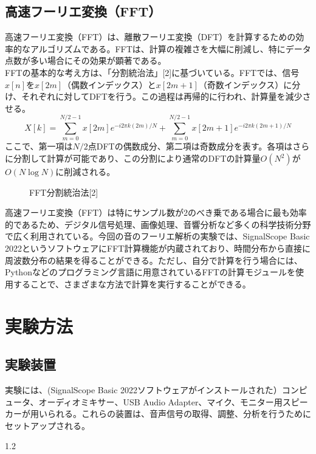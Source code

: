 \documentclass{article}
\begin{document}
\subsection{高速フーリエ変換（FFT）}
\begin{spacing}{1.2} %
    高速フーリエ変換（FFT）は、離散フーリエ変換（DFT）を計算するための効率的なアルゴリズムである。FFTは、計算の複雑さを大幅に削減し、特にデータ点数が多い場合にその効果が顕著である。\\
    \indent FFTの基本的な考え方は、「分割統治法」[2]に基づいている。FFTでは、信号$x[n]$を$x[2m]$（偶数インデックス）と$x[2m+1]$（奇数インデックス）に分け、それぞれに対してDFTを行う。この過程は再帰的に行われ、計算量を減少させる。
    \[X[k] = \sum_{m=0}^{N/2-1} x[2m] e^{-i 2\pi k(2m)/N} + \sum_{m=0}^{N/2-1} x[2m+1] e^{-i 2\pi k(2m+1)/N}\]
    \indent ここで、第一項は$N/2$点DFTの偶数成分、第二項は奇数成分を表す。各項はさらに分割して計算が可能であり、この分割により通常のDFTの計算量$O(N^2)$が$O(N\log N)$に削減される。
\end{spacing}
\begin{figure}[ht] %
    \centering
    \caption{FFT分割統治法[2]}
\end{figure}
\FloatBarrier
\begin{spacing}{1.2} %
    高速フーリエ変換（FFT）は特にサンプル数が2のべき乗である場合に最も効率的であるため、デジタル信号処理、画像処理、音響分析など多くの科学技術分野で広く利用されている。今回の音のフーリエ解析の実験では、SignalScope Basic 2022というソフトウェアにFFT計算機能が内蔵されており、時間分布から直接に周波数分布の結果を得ることができる。ただし、自分で計算を行う場合には、Pythonなどのプログラミング言語に用意されているFFTの計算モジュールを使用することで、さまざまな方法で計算を実行することができる。
\end{spacing}

\section{実験方法}

\subsection{実験装置}
\begin{spacing}{1.2}
    実験には、(SignalScope Basic 2022ソフトウェアがインストールされた）コンピュータ、オーディオミキサー、USB Audio Adapter、マイク、モニター用スピーカーが用いられる。これらの装置は、音声信号の取得、調整、分析を行うためにセットアップされる。
\end{spacing}{1.2}
\end{document}
